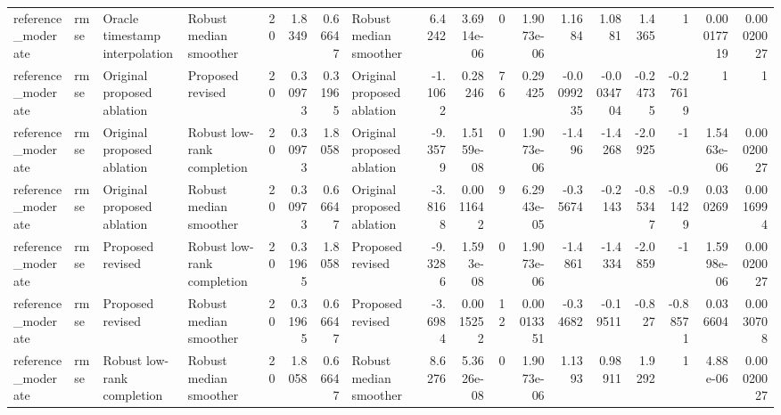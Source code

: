 \begin{table}[!htbp]
{\begin{tabular}{llllrrrlrrrrrrrrrr}
reference_moderate & rmse & Oracle timestamp interpolation & Robust median smoother & 20 & 1.8349 & 0.66647 & Robust median smoother & 6.4242 & 3.6914e-06 & 0 & 1.9073e-06 & 1.1684 & 1.0881 & 1.4365 & 1 & 0.00017719 & 0.00020027 \\
reference_moderate & rmse & Original proposed ablation & Proposed revised & 20 & 0.30973 & 0.31965 & Original proposed ablation & -1.1062 & 0.28246 & 76 & 0.29425 & -0.0099235 & -0.0034704 & -0.24735 & -0.27619 & 1 & 1 \\
reference_moderate & rmse & Original proposed ablation & Robust low-rank completion & 20 & 0.30973 & 1.8058 & Original proposed ablation & -9.3579 & 1.5159e-08 & 0 & 1.9073e-06 & -1.496 & -1.4268 & -2.0925 & -1 & 1.5463e-06 & 0.00020027 \\
reference_moderate & rmse & Original proposed ablation & Robust median smoother & 20 & 0.30973 & 0.66647 & Original proposed ablation & -3.8168 & 0.0011642 & 9 & 6.2943e-05 & -0.35674 & -0.2143 & -0.85347 & -0.91429 & 0.030269 & 0.0016994 \\
reference_moderate & rmse & Proposed revised & Robust low-rank completion & 20 & 0.31965 & 1.8058 & Proposed revised & -9.3286 & 1.593e-08 & 0 & 1.9073e-06 & -1.4861 & -1.4334 & -2.0859 & -1 & 1.5998e-06 & 0.00020027 \\
reference_moderate & rmse & Proposed revised & Robust median smoother & 20 & 0.31965 & 0.66647 & Proposed revised & -3.6984 & 0.0015252 & 12 & 0.00013351 & -0.34682 & -0.19511 & -0.827 & -0.88571 & 0.036604 & 0.0030708 \\
reference_moderate & rmse & Robust low-rank completion & Robust median smoother & 20 & 1.8058 & 0.66647 & Robust median smoother & 8.6276 & 5.3626e-08 & 0 & 1.9073e-06 & 1.1393 & 0.98911 & 1.9292 & 1 & 4.88e-06 & 0.00020027 \\
\bottomrule
\end{tabular}
}
\end{table}

